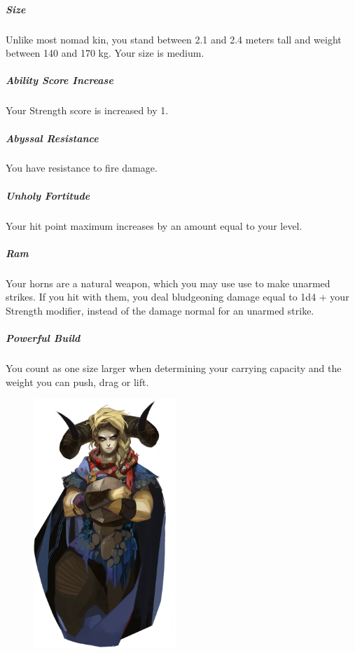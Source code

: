     \subparagraph{Size} Unlike most nomad kin, you stand between 2.1 and 2.4 meters tall and weight between 140 and 170 kg.
    Your size is medium.

    \subparagraph{Ability Score Increase} Your Strength score is increased by 1.


    \subparagraph{Abyssal Resistance} You have resistance to fire damage.

    \subparagraph{Unholy Fortitude} Your hit point maximum increases by an amount equal to your level.

    \subparagraph{Ram} Your horns are a natural weapon, which you may use use to make unarmed strikes.
    If you hit with them, you deal bludgeoning damage equal to 1d4 + your Strength modifier, instead of the damage normal for an unarmed strike.

    \subparagraph{Powerful Build} You count as one size larger when determining your carrying capacity and the weight you can push, drag or lift.

\begin{figure}[!b]
    \centering
    \includegraphics[width=0.48\textwidth]{04kins/img/19uman_cursed.png}
\end{figure}

\newpage
